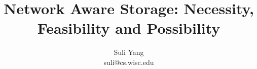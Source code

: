\documentclass[letterpaper,twocolumn,10pt]{article}
\begin{document}
\title{\Large \bf Network Aware Storage: Necessity, Feasibility and Possibility}

\author{
{\rm Suli Yang}\\
suli@cs.wisc.edu
} %

\maketitle






{}

\end{document}

